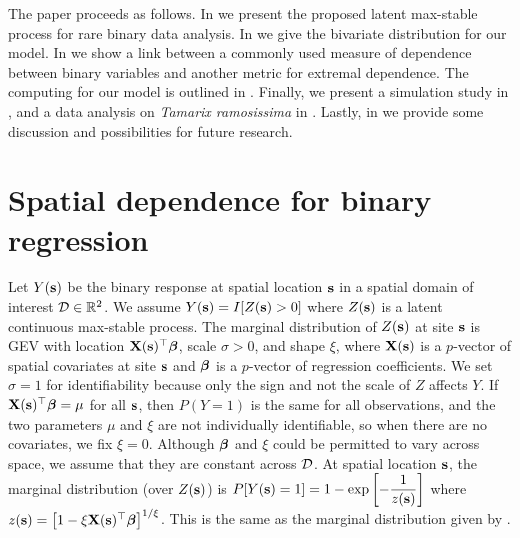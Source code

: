 The paper proceeds as follows. 
In  we present the proposed latent max-stable process for rare binary data analysis. 
In  we give the bivariate distribution for our model. 
In  we show a link between a commonly used measure of dependence between binary variables and another metric for extremal dependence. 
The computing for our model is outlined in . 
Finally, we present a simulation study in , and a data analysis on \emph{Tamarix ramosissima} in .
Lastly, in  we provide some discussion and possibilities for future research.

\section{Spatial dependence for binary regression} \label{rbs:maxstab}
Let $Y(\mathbf{s})$ be the binary response at spatial location $\mathbf{s}$ in a spatial domain of interest ${\cal D} \in \mathbb{R}^2$.
We assume $Y(\mathbf{s}) = I[Z(\mathbf{s}) > 0]$ where $Z(\mathbf{s})$ is a latent continuous max-stable process.
The marginal distribution of $Z(\mathbf{s})$ at site $\mathbf{s}$ is GEV with location $\mathbf{X}(\mathbf{s})^\top \mbox{\boldmath $\beta$}$, scale $\sigma > 0$, and shape $\xi$, where $\mathbf{X}(\mathbf{s})$ is a $p$-vector of spatial covariates at site $\mathbf{s}$ and $\mbox{\boldmath $\beta$}$ is a $p$-vector of regression coefficients.
We set $\sigma = 1$ for identifiability because only the sign and not the scale of $Z$ affects $Y$.
If $\mathbf{X}(\mathbf{s})^\top \mbox{\boldmath $\beta$} = \mu$ for all $\mathbf{s}$, then $P(Y = 1)$ is the same for all observations, and the two parameters $\mu$ and $\xi$ are not individually identifiable, so when there are no covariates, we fix $\xi = 0$.
Although $\mbox{\boldmath $\beta$}$ and $\xi$ could be permitted to vary across space, we assume that they are constant across ${\cal D}$.
At spatial location $\mathbf{s}$, the marginal distribution (over $Z(\mathbf{s})$) is \mbox{$P[Y(\mathbf{s}) = 1] = 1 - \exp\left[ -\displaystyle\frac{ 1 }{ z(\mathbf{s})} \right]$} where $z(\mathbf{s}) = \left[1 - \xi \mathbf{X}(\mathbf{s})^\top \mbox{\boldmath $\beta$}\right]^{1 / \xi}$.
This is the same as the marginal distribution given by \citet{Wang2010}.

